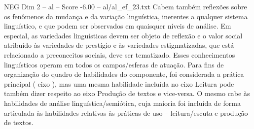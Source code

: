 \begin{textsample}{NEG Dim 2 – al – Score -6.00 – al/al\_ef\_23.txt}
Cabem também reflexões sobre os fenômenos da mudança e da variação linguística, inerentes a qualquer sistema linguístico, e que podem ser observados em quaisquer níveis de análise.
Em especial, as variedades linguísticas devem ser objeto de reflexão e o valor social atribuído às variedades de prestígio e às variedades estigmatizadas, que está relacionado a preconceitos sociais, deve ser tematizado.
Esses conhecimentos linguísticos operam em todos os campos/esferas de atuação.
Para fins de organização do quadro de habilidades do componente, foi considerada a prática principal ( eixo ), mas uma mesma habilidade incluída no eixo Leitura pode também dizer respeito ao eixo Produção de textos e vice-versa.
O mesmo cabe às habilidades de análise linguística/semiótica, cuja maioria foi incluída de forma articulada às habilidades relativas às práticas de uso – leitura/escuta e produção de textos.

\end{textsample}
